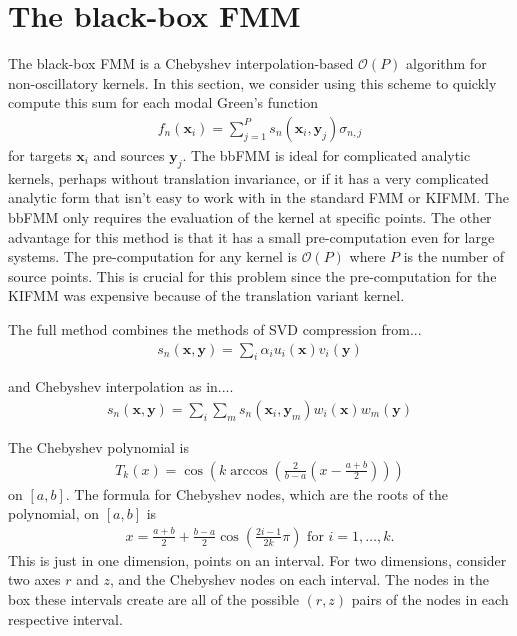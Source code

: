 \documentclass[11pt, oneside]{article}   	%
\begin{document}
\section{The black-box FMM}
The black-box FMM is a Chebyshev interpolation-based $\mathcal{O}(P)$ algorithm for non-oscillatory kernels. In this section, we consider using this scheme to quickly compute this sum for each modal Green's function
\begin{align}
f_n(\mathbf{x}_i)=\sum_{j=1}^P s_n(\mathbf{x}_i,\mathbf{y}_j)\sigma_{n,j}
\end{align}
for targets $\mathbf{x}_i$ and sources $\mathbf{y}_j$.
The bbFMM is ideal for complicated analytic kernels, perhaps without translation invariance, or if it has a very complicated analytic form that isn't easy to work with in the standard FMM or KIFMM. The bbFMM only requires the evaluation of the kernel at specific points. The other advantage for this method is that it has a small pre-computation even for large systems. The pre-computation for any kernel is $\mathcal{O}(P)$ where $P$ is the number of source points. This is crucial for this problem since the pre-computation for the KIFMM was expensive because of the translation variant kernel.

The full method combines the methods of SVD compression from...
\begin{align}
s_n(\mathbf{x},\mathbf{y})=\sum_i \alpha_i u_i(\mathbf{x})v_i(\mathbf{y})
\end{align}

and Chebyshev interpolation as in....
\begin{align}
s_n(\mathbf{x},\mathbf{y})=\sum_i\sum_m s_n(\mathbf{x}_i,\mathbf{y}_m)w_i(\mathbf{x})w_m(\mathbf{y})
\end{align}

The Chebyshev polynomial is
\begin{align}
T_k(x)=\cos(k\arccos(\frac{2}{b-a}(x-\frac{a+b}{2})))
\end{align}
on $[a,b]$. The formula for Chebyshev nodes, which are the roots of the polynomial, on $[a,b]$ is
\begin{align}
x=\frac{a+b}{2}+\frac{b-a}{2}\cos(\frac{2i-1}{2k}\pi)\mbox{ for }i=1,\dots,k.
\end{align}
This is just in one dimension, points on an interval. For two dimensions, consider two axes $r$ and $z$, and the Chebyshev nodes on each interval. The nodes in the box these intervals create are all of the possible $(r,z)$ pairs of the nodes in each respective interval.
\end{document}
